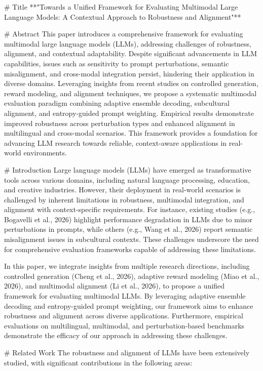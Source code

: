 # Title  
**"Towards a Unified Framework for Evaluating Multimodal Large Language Models: A Contextual Approach to Robustness and Alignment"**

# Abstract  
This paper introduces a comprehensive framework for evaluating multimodal large language models (LLMs), addressing challenges of robustness, alignment, and contextual adaptability. Despite significant advancements in LLM capabilities, issues such as sensitivity to prompt perturbations, semantic misalignment, and cross-modal integration persist, hindering their application in diverse domains. Leveraging insights from recent studies on controlled generation, reward modeling, and alignment techniques, we propose a systematic multimodal evaluation paradigm combining adaptive ensemble decoding, subcultural alignment, and entropy-guided prompt weighting. Empirical results demonstrate improved robustness across perturbation types and enhanced alignment in multilingual and cross-modal scenarios. This framework provides a foundation for advancing LLM research towards reliable, context-aware applications in real-world environments.

# Introduction  
Large language models (LLMs) have emerged as transformative tools across various domains, including natural language processing, education, and creative industries. However, their deployment in real-world scenarios is challenged by inherent limitations in robustness, multimodal integration, and alignment with context-specific requirements. For instance, existing studies (e.g., Bogavelli et al., 2026) highlight performance degradation in LLMs due to minor perturbations in prompts, while others (e.g., Wang et al., 2026) report semantic misalignment issues in subcultural contexts. These challenges underscore the need for comprehensive evaluation frameworks capable of addressing these limitations.

In this paper, we integrate insights from multiple research directions, including controlled generation (Cheng et al., 2026), adaptive reward modeling (Miao et al., 2026), and multimodal alignment (Li et al., 2026), to propose a unified framework for evaluating multimodal LLMs. By leveraging adaptive ensemble decoding and entropy-guided prompt weighting, our framework aims to enhance robustness and alignment across diverse applications. Furthermore, empirical evaluations on multilingual, multimodal, and perturbation-based benchmarks demonstrate the efficacy of our approach in addressing these challenges.

# Related Work  
The robustness and alignment of LLMs have been extensively studied, with significant contributions in the following areas:

